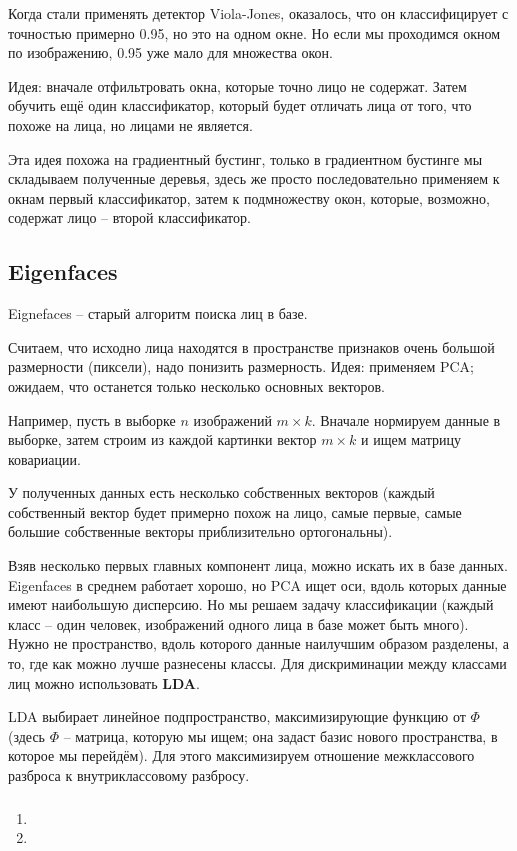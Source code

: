 \documentclass[main.tex]{subfiles}
\begin{document}
Когда стали применять детектор Viola-Jones, оказалось, что он классифицирует с точностью примерно 0.95, но это на одном окне.
Но если мы проходимся окном по изображению, 0.95 уже мало для множества окон.

Идея: вначале отфильтровать окна, которые точно лицо не содержат.
Затем обучить ещё один классификатор, который будет отличать лица от того, что похоже на лица, но лицами не является.

Эта идея похожа на градиентный бустинг, только в градиентном бустинге мы складываем полученные деревья, здесь же просто последовательно применяем к окнам первый классификатор, затем к подмножеству окон, которые, возможно, содержат лицо -- второй классификатор.

\subsection{Eigenfaces}

Eignefaces -- старый алгоритм поиска лиц в базе.

Считаем, что исходно лица находятся в пространстве признаков очень большой размерности (пиксели), надо понизить размерность.
Идея: применяем PCA; ожидаем, что останется только несколько основных векторов.

Например, пусть в выборке $ n $ изображений $ m \times k $.
Вначале нормируем данные в выборке, затем строим из каждой картинки вектор $ m \times k $ и ищем матрицу ковариации.

У полученных данных есть несколько собственных векторов (каждый собственный вектор будет примерно похож на лицо, самые первые, самые большие собственные векторы приблизительно ортогональны).

Взяв несколько первых главных компонент лица, можно искать их в базе данных. \\

Eigenfaces в среднем работает хорошо, но PCA ищет оси, вдоль которых данные имеют наибольшую дисперсию.
Но мы решаем задачу классификации (каждый класс -- один человек, изображений одного лица в базе может быть много).
Нужно не пространство, вдоль которого данные наилучшим образом разделены, а то, где как можно лучше разнесены классы.
Для дискриминации между классами лиц можно использовать \textbf{LDA}.

LDA выбирает линейное подпространство, максимизирующие функцию от $ \Phi $ (здесь $ \Phi $ -- матрица, которую мы ищем; она задаст базис нового пространства, в которое мы перейдём).
Для этого максимизируем отношение межклассового разброса к внутриклассовому разбросу.

\subsubsection{}

\begin{enumerate}[noitemsep]
	\item
	\item
\end{enumerate}
	
\end{document}
